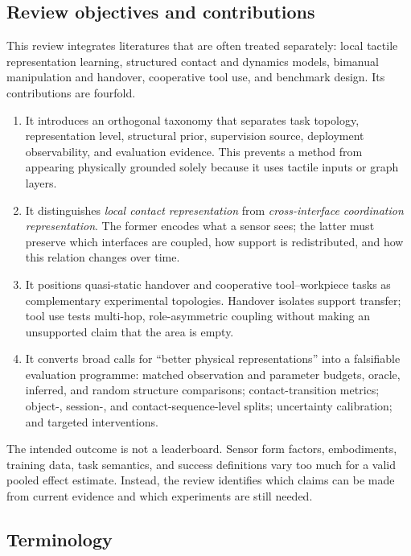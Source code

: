 \subsection{Review objectives and contributions}

This review integrates literatures that are often treated separately: local
tactile representation learning, structured contact and dynamics models,
bimanual manipulation and handover, cooperative tool use, and benchmark design.
Its contributions are fourfold.

\begin{enumerate}
  \item It introduces an orthogonal taxonomy that separates task topology,
  representation level, structural prior, supervision source, deployment
  observability, and evaluation evidence. This prevents a method from appearing
  physically grounded solely because it uses tactile inputs or graph layers.

  \item It distinguishes \emph{local contact representation} from
  \emph{cross-interface coordination representation}. The former encodes what a
  sensor sees; the latter must preserve which interfaces are coupled, how support
  is redistributed, and how this relation changes over time.

  \item It positions quasi-static handover and cooperative tool--workpiece tasks
  as complementary experimental topologies. Handover isolates support transfer;
  tool use tests multi-hop, role-asymmetric coupling without making an unsupported
  claim that the area is empty.

  \item It converts broad calls for ``better physical representations'' into a
  falsifiable evaluation programme: matched observation and parameter budgets,
  oracle, inferred, and random structure comparisons; contact-transition metrics;
  object-, session-, and contact-sequence-level splits; uncertainty calibration;
  and targeted interventions.
\end{enumerate}

The intended outcome is not a leaderboard. Sensor form factors, embodiments,
training data, task semantics, and success definitions vary too much for a valid
pooled effect estimate. Instead, the review identifies which claims can be made
from current evidence and which experiments are still needed.

\subsection{Terminology}

